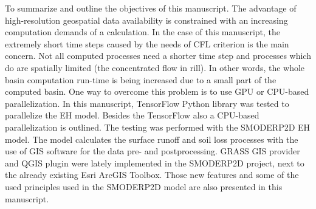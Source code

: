 To summarize and outline the objectives of this manuscript. The advantage of high-resolution
geospatial data availability is constrained with an increasing computation demands
of a calculation. In the case of this manuscript, the extremely 
short time steps caused by the needs of CFL criterion is the main concern. 
Not all computed processes need a shorter time step and processes which do are spatially limited (the concentrated flow in rill). 
In other words, 
the whole basin computation run-time is being increased due to a small part
of the computed basin. One way to overcome this problem is to use 
GPU or CPU-based parallelization. In this manuscript, TensorFlow Python library 
\cite{tensorflow2015-whitepaper} was tested to parallelize the EH model. 
Besides the TensorFlow also a CPU-based parallelization is outlined. 
The testing was performed with the SMODERP2D EH model. The model calculates the surface runoff
and soil loss processes with the use of GIS software for the data pre- and postprocessing. 
GRASS GIS provider and QGIS plugin were lately implemented in the SMODERP2D project, next to the already existing Esri ArcGIS Toolbox. 
Those new features and some of the used principles used in the SMODERP2D model are also presented in this manuscript. 

